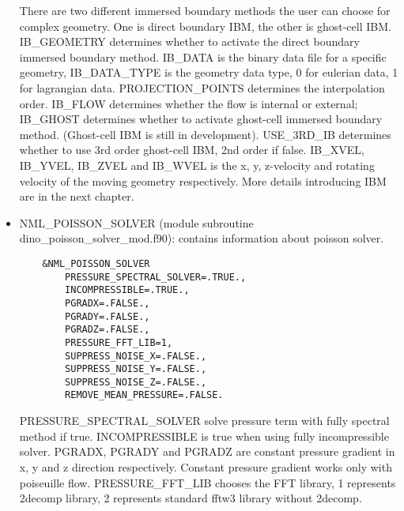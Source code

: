 \begin{itemize}
\begin{lstlisting}
  \end{lstlisting}
  There are two different immersed boundary methods the user can choose for complex geometry. One is direct boundary IBM, the other is ghost-cell IBM.
  IB\_GEOMETRY determines whether to activate the direct boundary immersed boundary method. IB\_DATA is the binary data file for a specific geometry, IB\_DATA\_TYPE is the geometry data type, 0 for eulerian data, 1 for lagrangian data. PROJECTION\_POINTS determines the interpolation order. IB\_FLOW determines whether the flow is internal or external;
  IB\_GHOST determines whether to activate ghost-cell immersed boundary method. (Ghost-cell IBM is still in development). USE\_3RD\_IB determines whether to use 3rd order ghost-cell IBM, 2nd order if false. IB\_XVEL, IB\_YVEL, IB\_ZVEL and IB\_WVEL is the x, y, z-velocity and rotating velocity of the moving geometry respectively.
  More details introducing IBM are in the next chapter.
  \item NML\_POISSON\_SOLVER (module subroutine dino\_poisson\_solver\_mod.f90): contains information about poisson solver.
  \begin{lstlisting}
    &NML_POISSON_SOLVER
        PRESSURE_SPECTRAL_SOLVER=.TRUE.,
        INCOMPRESSIBLE=.TRUE.,
        PGRADX=.FALSE.,
        PGRADY=.FALSE.,
        PGRADZ=.FALSE.,
        PRESSURE_FFT_LIB=1,
        SUPPRESS_NOISE_X=.FALSE.,
        SUPPRESS_NOISE_Y=.FALSE.,
        SUPPRESS_NOISE_Z=.FALSE.,
        REMOVE_MEAN_PRESSURE=.FALSE.
  \end{lstlisting}
  PRESSURE\_SPECTRAL\_SOLVER solve pressure term with fully spectral method if true. INCOMPRESSIBLE is true when using fully incompressible solver. PGRADX, PGRADY and PGRADZ are constant pressure gradient in x, y and z direction respectively. Constant pressure gradient works only with poiseuille flow. PRESSURE\_FFT\_LIB chooses the FFT library, 1 represents 2decomp library, 2 represents standard fftw3 library without 2decomp.


\end{itemize}
